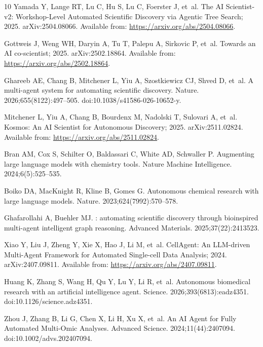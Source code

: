 \documentclass[10pt,letterpaper]{article}
\begin{document}
\begin{thebibliography}{10}
Yamada Y, Lange RT, Lu C, Hu S, Lu C, Foerster J, et~al. The {AI}
  {Scientist-v2}: Workshop-Level Automated Scientific Discovery via Agentic
  Tree Search; 2025.
\newblock arXiv:2504.08066.
\newblock Available from: \url{https://arxiv.org/abs/2504.08066}.

Gottweis J, Weng WH, Daryin A, Tu T, Palepu A, Sirkovic P, et~al. Towards an
  {AI} co-scientist; 2025.
\newblock arXiv:2502.18864.
\newblock Available from: \url{https://arxiv.org/abs/2502.18864}.

Ghareeb AE, Chang B, Mitchener L, Yiu A, Szostkiewicz CJ, Shved D, et~al.
\newblock A multi-agent system for automating scientific discovery.
\newblock Nature. 2026;655(8122):497--505.
\newblock doi:{10.1038/s41586-026-10652-y}.

Mitchener L, Yiu A, Chang B, Bourdenx M, Nadolski T, Sulovari A, et~al.
  Kosmos: An {AI} Scientist for Autonomous Discovery; 2025.
\newblock arXiv:2511.02824.
\newblock Available from: \url{https://arxiv.org/abs/2511.02824}.

Bran AM, Cox S, Schilter O, Baldassari C, White AD, Schwaller P.
\newblock Augmenting large language models with chemistry tools.
\newblock Nature Machine Intelligence. 2024;6(5):525--535.

Boiko DA, MacKnight R, Kline B, Gomes G.
\newblock Autonomous chemical research with large language models.
\newblock Nature. 2023;624(7992):570--578.

Ghafarollahi A, Buehler MJ.
: automating scientific discovery through bioinspired
  multi-agent intelligent graph reasoning.
\newblock Advanced Materials. 2025;37(22):2413523.

Xiao Y, Liu J, Zheng Y, Xie X, Hao J, Li M, et~al. {CellAgent}: An
  {LLM}-driven Multi-Agent Framework for Automated Single-cell Data Analysis;
  2024.
\newblock arXiv:2407.09811.
\newblock Available from: \url{https://arxiv.org/abs/2407.09811}.

Huang K, Zhang S, Wang H, Qu Y, Lu Y, Li R, et~al.
\newblock Autonomous biomedical research with an artificial intelligence agent.
\newblock Science. 2026;393(6813):eadz4351.
\newblock doi:{10.1126/science.adz4351}.

Zhou J, Zhang B, Li G, Chen X, Li H, Xu X, et~al.
\newblock An {AI} Agent for Fully Automated Multi-Omic Analyses.
\newblock Advanced Science. 2024;11(44):2407094.
\newblock doi:{10.1002/advs.202407094}.


\end{thebibliography}
\end{document}
